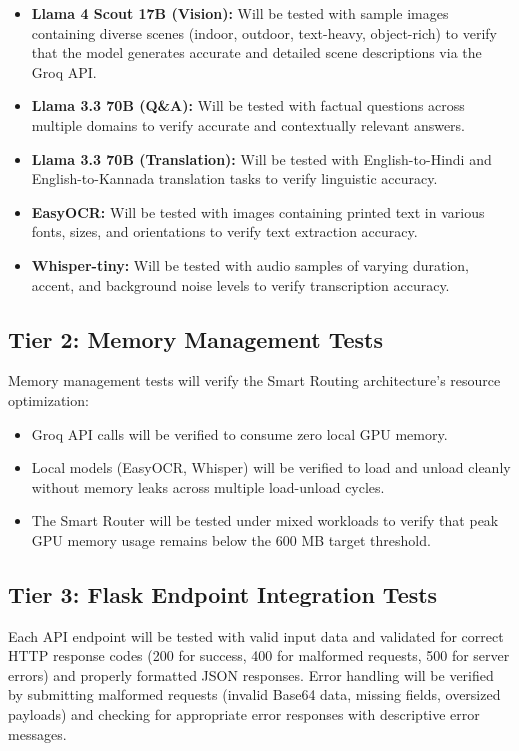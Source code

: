 \begin{itemize}[leftmargin=1.5cm]
\item \textbf{Llama 4 Scout 17B (Vision):} Will be tested with sample images containing diverse scenes (indoor, outdoor, text-heavy, object-rich) to verify that the model generates accurate and detailed scene descriptions via the Groq API.
\item \textbf{Llama 3.3 70B (Q\&A):} Will be tested with factual questions across multiple domains to verify accurate and contextually relevant answers.
\item \textbf{Llama 3.3 70B (Translation):} Will be tested with English-to-Hindi and English-to-Kannada translation tasks to verify linguistic accuracy.
\item \textbf{EasyOCR:} Will be tested with images containing printed text in various fonts, sizes, and orientations to verify text extraction accuracy.
\item \textbf{Whisper-tiny:} Will be tested with audio samples of varying duration, accent, and background noise levels to verify transcription accuracy.
\end{itemize}

\subsection{Tier 2: Memory Management Tests}
Memory management tests will verify the Smart Routing architecture's resource optimization:

\begin{itemize}[leftmargin=1.5cm]
\item Groq API calls will be verified to consume zero local GPU memory.
\item Local models (EasyOCR, Whisper) will be verified to load and unload cleanly without memory leaks across multiple load-unload cycles.
\item The Smart Router will be tested under mixed workloads to verify that peak GPU memory usage remains below the 600 MB target threshold.
\end{itemize}

\subsection{Tier 3: Flask Endpoint Integration Tests}
Each API endpoint will be tested with valid input data and validated for correct HTTP response codes (200 for success, 400 for malformed requests, 500 for server errors) and properly formatted JSON responses. Error handling will be verified by submitting malformed requests (invalid Base64 data, missing fields, oversized payloads) and checking for appropriate error responses with descriptive error messages.
